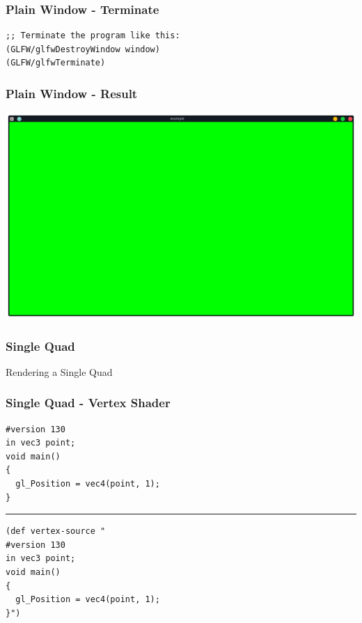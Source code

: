 \documentclass[aspectratio=169,11pt,xcolor=dvipsnames]{beamer}
\begin{document}
\begin{frame}[fragile]
  \frametitle{Plain Window {-} Terminate}
  \begin{verbatim}
;; Terminate the program like this:
(GLFW/glfwDestroyWindow window)
(GLFW/glfwTerminate)
  \end{verbatim}
\end{frame}

\begin{frame}
  \frametitle{Plain Window {-} Result}
  \begin{center}
    \includegraphics[width=.8\textwidth]{window}
  \end{center}
\end{frame}

\begin{frame}
  \frametitle{Single Quad}
  \begin{center}
    \begin{huge}
      Rendering a Single Quad
    \end{huge}
  \end{center}
\end{frame}

\begin{frame}[fragile]
  \frametitle{Single Quad {-} Vertex Shader}
  \begin{verbatim}
#version 130
in vec3 point;
void main()
{
  gl_Position = vec4(point, 1);
}
  \end{verbatim}
  \rule{\textwidth}{1pt}
  \begin{verbatim}
(def vertex-source "
#version 130
in vec3 point;
void main()
{
  gl_Position = vec4(point, 1);
}")
  \end{verbatim}
\end{frame}
\end{document}
